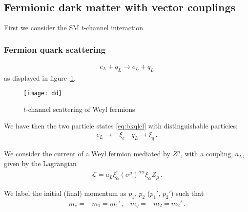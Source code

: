 \subsection{Fermionic dark matter with vector couplings}
First we consider the SM $t$-channel interaction

\subsubsection{Fermion quark scattering}


\begin{align}
  e_L+q_L \to e_L+q_L
\end{align}
as displayed in figure~\ref{fig:ddex}. 
\begin{figure}
  \centering
  \texttt{[image: dd]}
  \caption{$t$-channel scattering of Weyl fermions}
  \label{fig:ddex}
\end{figure}

We have then the two particle states \eqref{eq:bkqlel}  with distinguishable particles:
\begin{align}
  e_L\to& \xi_e\,& q_L\to \xi_q\,.
\end{align}

We consider the current of a Weyl fermion mediated by $Z^{\mu}$, with a coupling, $a_L$, given by the Lagrangian
\begin{align}
\label{eq:xietaz}
\mathcal{L}=a_L \xi^{\dagger}_{\dot{\alpha}}\left( \overline{\sigma}^{\mu} \right)^{\dot{\alpha}\alpha}\xi_{\alpha} Z_{\mu}\,.
\end{align}


We label the initial (final) momentum as $p_1$, $p_2$ ($p_1'$, $p_2'$) such that
\begin{align}
  m_e=&m_1=m_1'\,,&m_q=&m_2=m_2'\,.
\end{align}


